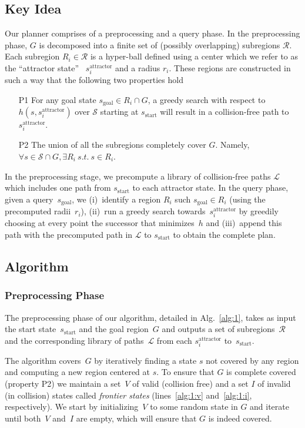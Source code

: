 \documentclass[letterpaper, 10 pt, conference]{ieeeconf}  %
\newcommand{\calL}{\ensuremath{\mathcal{L}}\xspace}
\newcommand{\calS}{\ensuremath{\mathcal{S}}\xspace}
\newcommand{\calR}{\ensuremath{\mathcal{R}}\xspace}
\newcommand{\sAttract}{\ensuremath{s^{\text{attractor}}_i}\xspace}
\newcommand{\sStart}{\ensuremath{s_{\text{start}}\xspace}}
\newcommand{\sGoal}{\ensuremath{s_{\text{goal}}\xspace}}
\begin{document}
\subsection{Key Idea}
Our planner comprises of a preprocessing and a query phase. 
In the preprocessing phase, $G$ is decomposed into a finite  set of (possibly overlapping) subregions $\calR$.
Each subregion $R_i \in \calR$ is a hyper-ball defined using a center which we refer to as the ``attractor state''~
\sAttract and a radius $r_i$.
These regions are constructed in such a way that the following two properties hold
\begin{enumerate}
  \item[P1] For any goal state $s_{\text{goal}} \in R_i \cap G$, a greedy search with respect to $h(s, \sAttract)$ over $\calS$ starting at $\sStart$ will result in a collision-free path to \sAttract.
  \item[P2] The union of all the subregions completely cover $G$. 
  		Namely, $\forall s \in \calS \cap G, \exists R_i \ s.t. \ s \in R_i$.
\end{enumerate}

In the preprocessing stage, we precompute a library of collision-free paths $\calL$ which includes one path from $\sStart$ to each attractor state. 
In the query phase, given a query~\sGoal, we 
(i)~identify a region $R_i$ such $\sGoal \in R_i$ (using the precomputed radii~$r_i$),
(ii)~run a greedy search towards~\sAttract by greedily choosing at every point the successor that minimizes~$h$ and
(iii)~append this path with the precomputed path in $\calL$ to $\sStart$ to obtain the complete plan.

\subsection {Algorithm}
\subsubsection{Preprocessing Phase}
The preprocessing phase of our algorithm, detailed in Alg.~\ref{alg:1}, takes as input the start state~$\sStart$ and the goal region~$G$ and outputs a set of subregions~$\calR$ and the corresponding library of paths~$\calL$ from each \sAttract to~\sStart. 

The algorithm covers~$G$ by iteratively finding a state $s$ not covered by any region and computing a new region centered at $s$.
To ensure that $G$ is complete covered (property P2) we maintain a set~$V$ of valid (collision free) and a set $I$ of invalid (in collision) states called \emph{frontier states} (lines~\ref{alg:1:v} and~\ref{alg:1:i}, respectively).
We start by initializing~$V$ to some random state in $G$ and iterate until both~$V$ and~$I$ are empty, which will ensure that $G$ is indeed covered.
\end{document}
